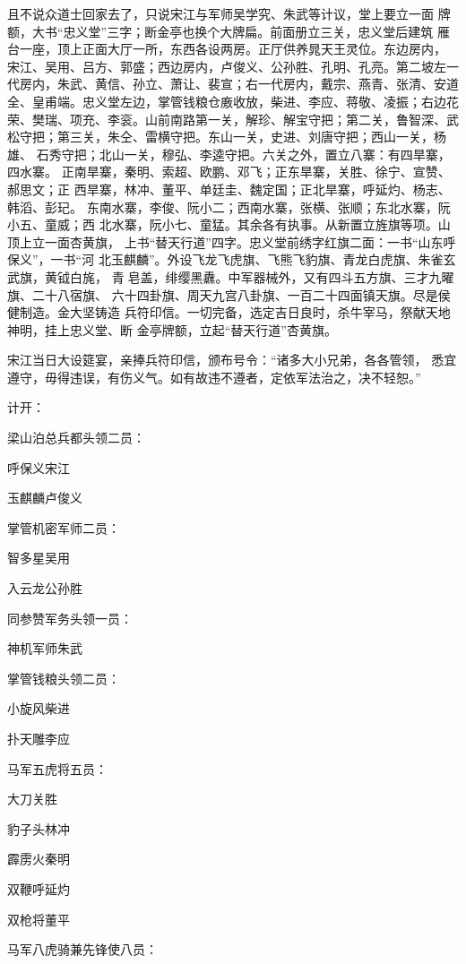 且不说众道士回家去了，只说宋江与军师吴学究、朱武等计议，堂上要立一面
牌额，大书“忠义堂”三字；断金亭也换个大牌扁。前面册立三关，忠义堂后建筑
雁台一座，顶上正面大厅一所，东西各设两房。正厅供养晁天王灵位。东边房内，
宋江、吴用、吕方、郭盛；西边房内，卢俊义、公孙胜、孔明、孔亮。第二坡左一
代房内，朱武、黄信、孙立、萧让、裴宣；右一代房内，戴宗、燕青、张清、安道
全、皇甫端。忠义堂左边，掌管钱粮仓廒收放，柴进、李应、蒋敬、凌振；右边花
荣、樊瑞、项充、李衮。山前南路第一关，解珍、解宝守把；第二关，鲁智深、武
松守把；第三关，朱仝、雷横守把。东山一关，史进、刘唐守把；西山一关，杨雄、
石秀守把；北山一关，穆弘、李逵守把。六关之外，置立八寨：有四旱寨，四水寨。
正南旱寨，秦明、索超、欧鹏、邓飞；正东旱寨，关胜、徐宁、宣赞、郝思文；正
西旱寨，林冲、董平、单廷圭、魏定国；正北旱寨，呼延灼、杨志、韩滔、彭玘。
东南水寨，李俊、阮小二；西南水寨，张横、张顺；东北水寨，阮小五、童威；西
北水寨，阮小七、童猛。其余各有执事。从新置立旌旗等项。山顶上立一面杏黄旗，
上书“替天行道”四字。忠义堂前绣字红旗二面：一书“山东呼保义”，一书“河
北玉麒麟”。外设飞龙飞虎旗、飞熊飞豹旗、青龙白虎旗、朱雀玄武旗，黄钺白旄，
青皂盖，绯缨黑纛。中军器械外，又有四斗五方旗、三才九曜旗、二十八宿旗、
六十四卦旗、周天九宫八卦旗、一百二十四面镇天旗。尽是侯健制造。金大坚铸造
兵符印信。一切完备，选定吉日良时，杀牛宰马，祭献天地神明，挂上忠义堂、断
金亭牌额，立起“替天行道”杏黄旗。

宋江当日大设筵宴，亲捧兵符印信，颁布号令：“诸多大小兄弟，各各管领，
悉宜遵守，毋得违误，有伤义气。如有故违不遵者，定依军法治之，决不轻恕。”

计开：

梁山泊总兵都头领二员：

呼保义宋江

玉麒麟卢俊义

掌管机密军师二员：

智多星吴用

入云龙公孙胜

同参赞军务头领一员：

神机军师朱武

掌管钱粮头领二员：

小旋风柴进

扑天雕李应

马军五虎将五员：

大刀关胜

豹子头林冲

霹雳火秦明

双鞭呼延灼

双枪将董平

马军八虎骑兼先锋使八员：

